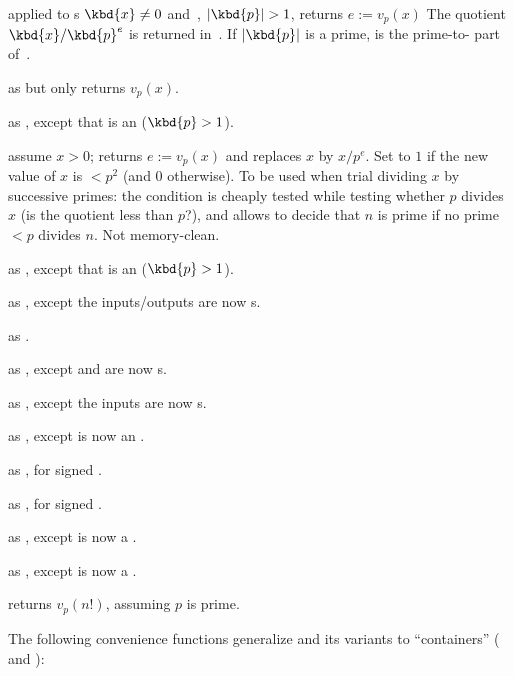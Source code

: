  applied to s
$\kbd{x}\neq 0$ and~, $|\kbd{p}| > 1$, returns $e := v_p(x)$
The quotient $\kbd{x}/\kbd{p}^e$ is returned in~. If
$|\kbd{p}|$ is a prime,  is the prime-to- part of~.

 as  but only returns
$v_p(x)$.

 as ,
except that  is an  ($\kbd{p} > 1$).

 assume $x > 0$;
returns $e := v_p(x)$ and replaces $x$ by $x / p^e$. Set  to $1$ if
the new value of $x$ is $ < p^2$ (and $0$ otherwise). To be used when trial
dividing $x$ by successive primes: the  condition is cheaply tested
while testing whether $p$ divides $x$ (is the quotient less than $p$?), and
allows to decide that $n$ is prime if no prime $< p$ divides $n$. Not
memory-clean.

 as ,
except that  is an  ($\kbd{p} > 1$).

 as ,
except the inputs/outputs are now s.

 as
.

 as ,
except  and  are now s.

 as ,
except the inputs are now s.

 as ,
except  is now an .

 as , for signed .

 as , for signed .

 as ,
except  is now a .

 as ,
except  is now a .

 returns $v_p(n!)$, assuming
$p$ is prime.

The following convenience functions generalize  and its variants
to ``containers'' ( and ):


